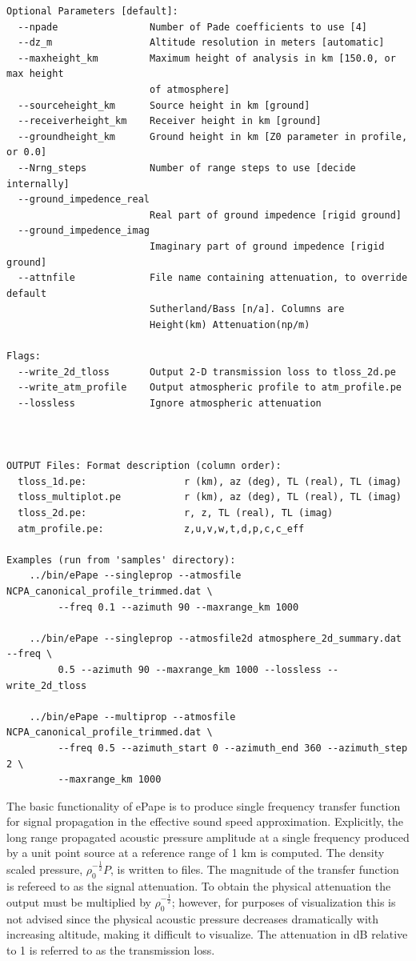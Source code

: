 \begin{verbatim}
Optional Parameters [default]:
  --npade                Number of Pade coefficients to use [4]
  --dz_m                 Altitude resolution in meters [automatic]
  --maxheight_km         Maximum height of analysis in km [150.0, or max height
                         of atmosphere]
  --sourceheight_km      Source height in km [ground]
  --receiverheight_km    Receiver height in km [ground]
  --groundheight_km      Ground height in km [Z0 parameter in profile, or 0.0]
  --Nrng_steps           Number of range steps to use [decide internally]
  --ground_impedence_real
                         Real part of ground impedence [rigid ground]
  --ground_impedence_imag
                         Imaginary part of ground impedence [rigid ground]
  --attnfile             File name containing attenuation, to override default
                         Sutherland/Bass [n/a]. Columns are
                         Height(km) Attenuation(np/m)

Flags:
  --write_2d_tloss       Output 2-D transmission loss to tloss_2d.pe
  --write_atm_profile    Output atmospheric profile to atm_profile.pe
  --lossless             Ignore atmospheric attenuation



OUTPUT Files: Format description (column order):
  tloss_1d.pe:                 r (km), az (deg), TL (real), TL (imag)
  tloss_multiplot.pe           r (km), az (deg), TL (real), TL (imag)
  tloss_2d.pe:                 r, z, TL (real), TL (imag)
  atm_profile.pe:              z,u,v,w,t,d,p,c,c_eff

Examples (run from 'samples' directory):
    ../bin/ePape --singleprop --atmosfile NCPA_canonical_profile_trimmed.dat \
         --freq 0.1 --azimuth 90 --maxrange_km 1000

    ../bin/ePape --singleprop --atmosfile2d atmosphere_2d_summary.dat --freq \
         0.5 --azimuth 90 --maxrange_km 1000 --lossless --write_2d_tloss

    ../bin/ePape --multiprop --atmosfile NCPA_canonical_profile_trimmed.dat \
         --freq 0.5 --azimuth_start 0 --azimuth_end 360 --azimuth_step 2 \
         --maxrange_km 1000

\end{verbatim}

The basic functionality of ePape is to produce single frequency transfer function for signal propagation in the effective sound speed approximation. Explicitly, the long range propagated acoustic pressure amplitude at a single frequency produced by a unit point source at a reference range of 1 km is computed. The density scaled pressure, $\rho_0^{-\frac{1}{2}}P$, is written to files. The magnitude of the transfer function is refereed to as the signal attenuation. To obtain the physical attenuation the output must be multiplied by $\rho_0^{-\frac{1}{2}}$; however, for purposes of visualization this is not advised since the physical acoustic pressure decreases dramatically with increasing altitude, making it difficult to visualize. The attenuation in dB relative to 1 is referred to as the transmission loss. 

